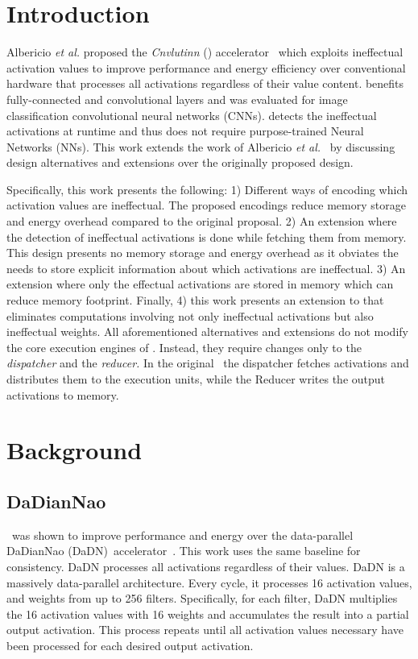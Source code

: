 \section{Introduction}

Albericio \textit{et al.} proposed the \textit{Cnvlutinn } (\ZF) accelerator~\cite{cnvlutin} which exploits ineffectual activation values to improve performance and energy efficiency over conventional hardware that processes all activations regardless of their value content. \ZF benefits fully-connected and convolutional layers and was evaluated for image classification convolutional neural networks (CNNs). \ZF detects the ineffectual activations at runtime and thus does not require purpose-trained Neural Networks (NNs). This work extends the work of Albericio \textit{et al.}~\cite{cnvlutin} by discussing design alternatives and extensions over the originally proposed design.

Specifically, this work presents the following: 1) Different ways of encoding which activation values are ineffectual. The proposed encodings reduce memory storage and energy overhead compared to the original proposal. 2) An extension where the detection of ineffectual activations is done while fetching them from memory. This design presents no memory  storage and energy overhead as it obviates the needs to store explicit information about which activations are ineffectual. 3) An extension where only the effectual activations are stored in memory which can reduce memory footprint. Finally, 4) this work presents an extension to \ZF that eliminates computations involving not only ineffectual activations but also ineffectual weights. All aforementioned alternatives and extensions do not modify the core execution engines of \ZF. Instead, they require changes only to the \textit{dispatcher} and the \textit{reducer. }In the original \ZF\ the dispatcher  fetches activations and distributes them to the execution units, while the Reducer writes the output activations to memory.  
\section{Background}
\subsection{DaDianNao}


\ZFL\ was shown to improve performance and energy over  the data-parallel  DaDianNao (DaDN)\ accelerator~\cite{DaDiannao}. This work uses the same baseline for consistency. DaDN processes all activations regardless of their values. DaDN is a massively data-parallel architecture. Every cycle, it processes 16 activation values, and weights from up to 256 filters. Specifically, for each filter, DaDN multiplies the 16 activation values with 16 weights and accumulates the result into a partial output activation. This process repeats until all activation values necessary have been processed for each desired output activation.  

